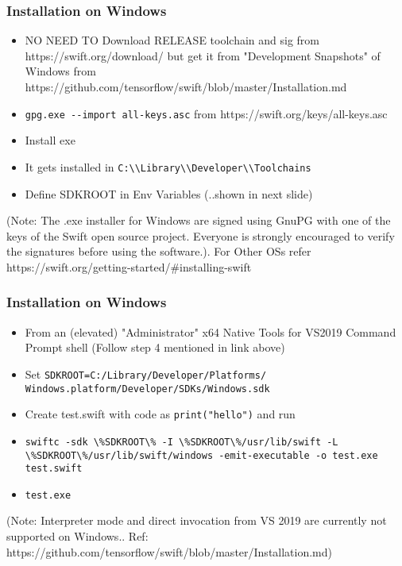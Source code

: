 \begin{frame} \frametitle{Installation on Windows}
\begin{itemize}
\item NO NEED TO Download RELEASE toolchain and sig from https://swift.org/download/ but get it from "Development Snapshots" of Windows from https://github.com/tensorflow/swift/blob/master/Installation.md

\item \lstinline|gpg.exe --import all-keys.asc| from https://swift.org/keys/all-keys.asc
\item Install exe
\item It gets installed in \lstinline|C:\\Library\\Developer\\Toolchains|
\item Define SDKROOT in Env Variables (..shown in next slide)
\end{itemize}

{\tiny (Note:  The .exe installer for Windows are signed using GnuPG with one of the keys of the Swift open source project. Everyone is strongly encouraged to verify the signatures before using the software.). For Other OSs refer https://swift.org/getting-started/\#installing-swift}
\end{frame}

\begin{frame} \frametitle{Installation on Windows}
\begin{itemize}

\item From an (elevated) "Administrator" x64 Native Tools for VS2019 Command Prompt shell (Follow step 4 mentioned in link above)
\item Set \lstinline|SDKROOT=C:/Library/Developer/Platforms/| \lstinline|Windows.platform/Developer/SDKs/Windows.sdk|
\item Create test.swift with code as \lstinline|print("hello")| and run
\item \lstinline|swiftc -sdk \%SDKROOT\% -I \%SDKROOT\%/usr/lib/swift -L \%SDKROOT\%/usr/lib/swift/windows -emit-executable -o test.exe test.swift|
\item \lstinline|test.exe|
\end{itemize}
{\tiny (Note:  Interpreter mode and direct invocation from VS 2019 are currently not supported on Windows.. Ref: https://github.com/tensorflow/swift/blob/master/Installation.md)}
\end{frame}